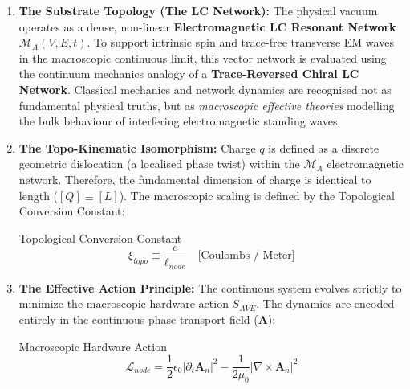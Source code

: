 \begin{enumerate}
    \item \textbf{The Substrate Topology (The LC Network):} The physical vacuum operates as a dense, non-linear \textbf{Electromagnetic LC Resonant Network} $\mathcal{M}_A(V, E, t)$. To support intrinsic spin and trace-free transverse EM waves in the macroscopic continuous limit, this vector network is evaluated using the continuum mechanics analogy of a \textbf{Trace-Reversed Chiral LC Network}. Classical mechanics and network dynamics are recognised not as fundamental physical truths, but as \textit{macroscopic effective theories} modelling the bulk behaviour of interfering electromagnetic standing waves.
    
    \item \textbf{The Topo-Kinematic Isomorphism:} Charge $q$ is defined as a discrete geometric dislocation (a localised phase twist) within the $\mathcal{M}_A$ electromagnetic network. Therefore, the fundamental dimension of charge is identical to length ($[Q] \equiv [L]$). The macroscopic scaling is defined by the Topological Conversion Constant:
    \begin{resultbox}{Topological Conversion Constant}
    \begin{equation}
        \xi_{topo} \equiv \frac{e}{\ell_{node}} \quad \text{[Coulombs / Meter]}
    \end{equation}
    \end{resultbox}
    
    \item \textbf{The Effective Action Principle:} The continuous system evolves strictly to minimize the macroscopic hardware action $S_{AVE}$. The dynamics are encoded entirely in the continuous phase transport field ($\mathbf{A}$):
    \begin{resultbox}{Macroscopic Hardware Action}
    \begin{equation}
        \mathcal{L}_{node} = \frac{1}{2}\epsilon_0 |\partial_t \mathbf{A}_n|^2 - \frac{1}{2\mu_0} |\nabla \times \mathbf{A}_n|^2
    \end{equation}
    \end{resultbox}
    

\end{enumerate}
